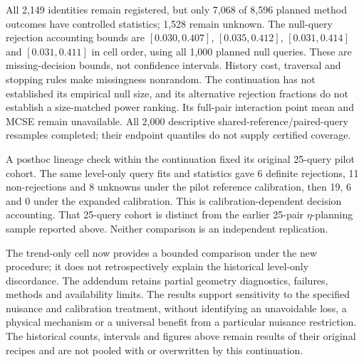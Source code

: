 All 2,149 identities remain registered, but only 7,068 of 8,596 planned
method outcomes have controlled statistics; 1,528 remain unknown. The
null-query rejection accounting bounds are \([0.030,0.407]\),
\([0.035,0.412]\), \([0.031,0.414]\) and \([0.031,0.411]\) in cell order,
using all 1,000 planned null queries. These are missing-decision bounds,
not confidence intervals. History cost, traversal and stopping rules make
missingness nonrandom. The continuation has not established its empirical
null size, and its alternative rejection fractions do not establish a
size-matched power ranking. Its full-pair interaction point mean and MCSE
remain unavailable. All 2,000 descriptive shared-reference/paired-query
resamples completed; their endpoint quantiles do not supply certified coverage.

A posthoc lineage check within the continuation fixed its original
25-query pilot cohort. The same level-only query fits and statistics gave
6 definite rejections, 11 non-rejections and 8 unknowns under the pilot
reference calibration, then 19, 6 and 0 under the expanded calibration.
This is calibration-dependent decision accounting. That 25-query cohort
is distinct from the earlier 25-pair \(\eta\)-planning sample reported
above. Neither comparison is an independent replication.

The trend-only cell now provides a bounded comparison under the new
procedure; it does not retrospectively explain the historical level-only
discordance. The addendum retains partial geometry diagnostics, failures,
methods and availability limits. The results support sensitivity to the
specified nuisance and calibration treatment, without identifying an
unavoidable loss, a physical mechanism or a universal benefit from a
particular nuisance restriction. The historical counts, intervals and
figures above remain results of their original recipes and are not pooled
with or overwritten by this continuation.

